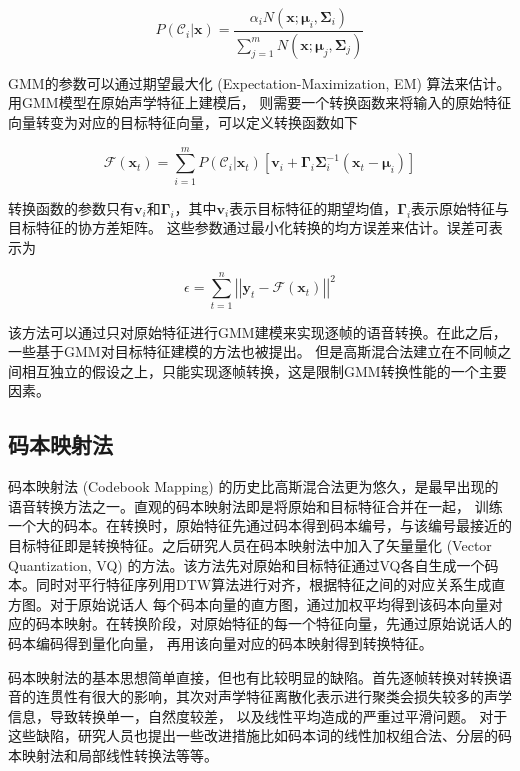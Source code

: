 \begin{equation}
    P(\mathcal{C}_i|\mathbf{x})=\frac{\alpha_iN(\mathbf{x};\bm{\mu}_i,\bm{\Sigma}_i)}{\sum^m_{j=1}N(\mathbf{x};\bm{\mu}_j,\bm{\Sigma}_j)}
\end{equation}

GMM的参数可以通过期望最大化 (Expectation-Maximization, EM) 算法来估计。用GMM模型在原始声学特征上建模后，
则需要一个转换函数来将输入的原始特征向量转变为对应的目标特征向量，可以定义转换函数如下

\begin{equation}
    \mathcal{F}(\mathbf{x}_t) = \sum^m_{i=1}P(\mathcal{C}_i|\mathbf{x}_t)\left[ \mathbf{v}_i + \bm{\Gamma}_i \bm{\Sigma}_i^{-1} (\mathbf{x}_t-\bm{\mu}_i) \right]
\end{equation}

转换函数的参数只有$\mathbf{v}_i$和$\bm{\Gamma}_i$，其中$\mathbf{v}_i$表示目标特征的期望均值，$\bm{\Gamma}_i$表示原始特征与目标特征的协方差矩阵。
这些参数通过最小化转换的均方误差来估计。误差可表示为

\begin{equation}
    \epsilon = \sum^n_{t=1} \left| \left| \mathbf{y}_t - \mathcal{F}(\mathbf{x}_t) \right| \right|^2
\end{equation}

该方法可以通过只对原始特征进行GMM建模来实现逐帧的语音转换。在此之后，一些基于GMM对目标特征建模的方法也被提出\cite{kain1998spectral}。
但是高斯混合法建立在不同帧之间相互独立的假设之上，只能实现逐帧转换，这是限制GMM转换性能的一个主要因素。

\subsection{码本映射法}
码本映射法 (Codebook Mapping) 的历史比高斯混合法更为悠久，是最早出现的语音转换方法之一。直观的码本映射法即是将原始和目标特征合并在一起，
训练一个大的码本。在转换时，原始特征先通过码本得到码本编号，与该编号最接近的目标特征即是转换特征。之后研究人员在码本映射法中加入了矢量量化 (Vector Quantization, VQ) 
的方法。该方法先对原始和目标特征通过VQ各自生成一个码本。同时对平行特征序列用DTW算法进行对齐，根据特征之间的对应关系生成直方图。对于原始说话人
每个码本向量的直方图，通过加权平均得到该码本向量对应的码本映射。在转换阶段，对原始特征的每一个特征向量，先通过原始说话人的码本编码得到量化向量，
再用该向量对应的码本映射得到转换特征。

码本映射法的基本思想简单直接，但也有比较明显的缺陷。首先逐帧转换对转换语音的连贯性有很大的影响，其次对声学特征离散化表示进行聚类会损失较多的声学信息，导致转换单一，自然度较差，
以及线性平均造成的严重过平滑问题。
对于这些缺陷，研究人员也提出一些改进措施比如码本词的线性加权组合法、分层的码本映射法和局部线性转换法等等。

